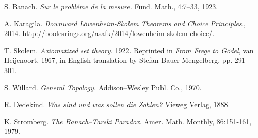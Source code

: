 \documentclass[12pt,a4paper]{report}
\theoremstyle{definition}
\theoremstyle{num.custom-title}
\begin{document}
\begin{thebibliography}{3}
S. Banach. \emph{Sur le probléme de la mesure.} Fund. Math., 4:7–33, 1923.

A. Karagila. \emph{Downward Löwenheim-Skolem Theorems and Choice Principles.}, 2014. \url{http://boolesrings.org/asafk/2014/lowenheim-skolem-choice/}.

T. Skolem. \emph{Axiomatized set theory.} 1922. Reprinted in \emph{From Frege to Gödel}, van Heijenoort, 1967, in English translation by Stefan Bauer-Mengelberg, pp. 291–301.

S. Willard. \emph{General Topology.} Addison–Wesley Publ. Co., 1970.

R. Dedekind. \emph{Was sind und was sollen die Zahlen?} Vieweg Verlag, 1888.

K. Stromberg. \emph{The Banach–Tarski Paradox.} Amer. Math. Monthly, 86:151-161, 1979.

\end{thebibliography}
\end{document}
